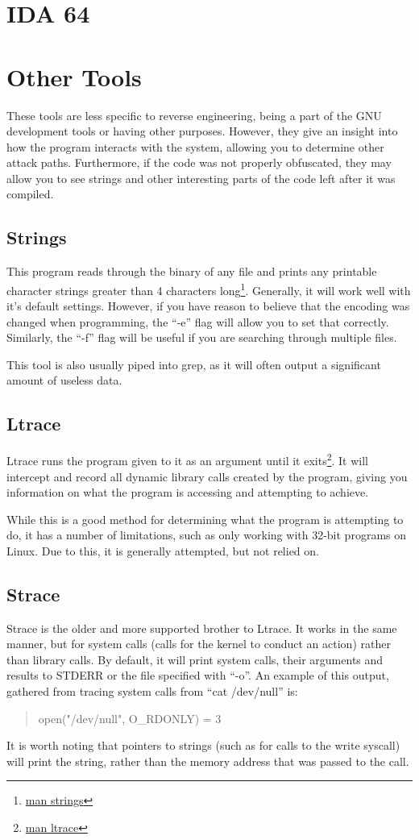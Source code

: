 	\section{IDA 64}
	\section{Other Tools}
		These tools are less specific to reverse engineering, being a part of the GNU development tools or having other purposes. 
		However, they give an insight into how the program interacts with the system, allowing you to determine other attack paths. 
		Furthermore, if the code was not properly obfuscated, they may allow you to see strings and other interesting parts of the code left after it was compiled. 
		\subsection{Strings}
			This program reads through the binary of any file and prints any printable character strings greater than 4 characters long\footnote{\href{http://linuxcommand.org/man\_pages/strings1.html}{man strings}}.
			Generally, it will work well with it's default settings. 
			However, if you have reason to believe that the encoding was changed when programming, the ``-e'' flag will allow you to set that correctly. 
			Similarly, the ``-f'' flag will be useful if you are searching through multiple files. 

			This tool is also usually piped into grep, as it will often output a significant amount of useless data. 
		\subsection{Ltrace}
			Ltrace runs the program given to it as an argument until it exits\footnote{\href{http://linuxcommand.org/man\_pages/ltrace1.html}{man ltrace}}.
			It will intercept and record all dynamic library calls created by the program, giving you information on what the program is accessing and attempting to achieve. 
		
			While this is a good method for determining what the program is attempting to do, it has a number of limitations, such as only working with 32-bit programs on Linux. 
			Due to this, it is generally attempted, but not relied on. 
		\subsection{Strace}
			Strace is the older and more supported brother to Ltrace. 
			It works in the same manner, but for system calls (calls for the kernel to conduct an action) rather than library calls. 
			By default, it will print system calls, their arguments and results to STDERR or the file specified with ``-o''. 
			An example of this output, gathered from tracing system calls from ``cat /dev/null'' is:
			\begin{quote}
				open("/dev/null", O\_RDONLY) = 3
			\end{quote}
			It is worth noting that pointers to strings (such as for calls to the write syscall) will print the string, rather than the memory address that was passed to the call. 

